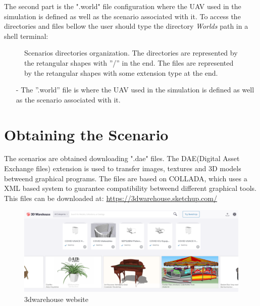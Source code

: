 	The second part is the ".world" file configuration where the UAV used in the simulation is defined as well as the scenario associated with it. To access the directories and files bellow the user should type the directory \textit{Worlds} path in a shell terminal: 
	
		
		\begin{figure}[H]
			\center
			\caption{Scenarios directories organization. The directories are represented by the retangular shapes with ''/'' in the end. The files are represented by the retangular shapes with some extension type at the end.}
			\label{cenario2}
		\end{figure}
		
		\begin{itemize}
			\itemsep0em 
			\item[-]The ''.world'' file is where the UAV used in the simulation is defined as well as the scenario associated with it.
		\end{itemize}
		
		
		\section{Obtaining the Scenario}
		

		The scenarios are obtained downloading ".dae" files. The DAE(Digital Asset Exchange files) extension is used to transfer images, textures and 3D models betweend graphical programs. The files are based on COLLADA, which uses a XML based system to guarantee compatibility betweend different graphical tools. This files can be downloaded at: \url{https://3dwarehouse.sketchup.com/}
		

		
		\begin{figure}[!ht]
			\centering
			\includegraphics[width=450pt]{figuras/3dwh.png}
			\caption{3dwarehouse website}
			\label{3dwh}
		\end{figure}
		
